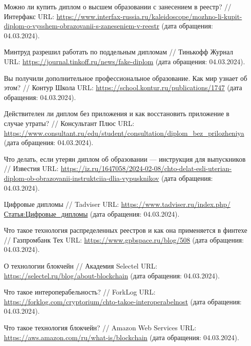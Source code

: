 \begin{thebibliography}{99\kern\bibindent}
    \setlength{\itemindent}{-0.35cm} %
	\setlength{\leftskip}{0.35cm}

	 Можно ли купить диплом о высшем образовании с занесением в реестр? // Интерфакс URL: \url{https://www.interfax-russia.ru/kaleidoscope/mozhno-li-kupit-diplom-o-vysshem-obrazovanii-s-zaneseniem-v-reestr} (дата обращения: 04.03.2024).

	 Минтруд разрешил работать по поддельным дипломам // Тинькофф Журнал URL: \url{https://journal.tinkoff.ru/news/fake-diplom} (дата обращения: 04.03.2024).

	 Вы получили дополнительное профессиональное образование. Как мир узнает об этом? // Контур Школа URL: \url{https://school.kontur.ru/publications/1747} (дата обращения: 04.03.2024).

	 Действителен ли диплом без приложения и как восстановить приложение в случае утраты? // Консультант Плюс URL: \url{https://www.consultant.ru/edu/student/consultation/diplom_bez_prilozheniya} (дата обращения: 04.03.2024).

	 Что делать, если утерян диплом об образовании — инструкция для выпускников // Известия URL: \url{https://iz.ru/1647058/2024-02-08/chto-delat-esli-uterian-diplom-ob-obrazovanii-instruktciia-dlia-vypusknikov} (дата обращения: 04.03.2024).

	 Цифровые дипломы // Tadviser URL: \url{https://www.tadviser.ru/index.php/Статья:Цифровые_дипломы} (дата обращения: 04.03.2024).

	 Что такое технология распределенных реестров и как она применяется в финтехе // Газпромбанк Тех URL: \url{https://www.gpbspace.ru/blog/508} (дата обращения: 04.03.2024).

	 О технологии блокчейн // Академия Selectel URL: \url{https://selectel.ru/blog/about-blockchain} (дата обращения: 04.03.2024).

	 Что такое интероперабельность? // ForkLog URL: \url{https://forklog.com/cryptorium/chto-takoe-interoperabelnost} (дата обращения: 04.03.2024).

	 Что такое технология блокчейн? // Amazon Web Services URL: \url{https://aws.amazon.com/ru/what-is/blockchain} (дата обращения: 04.03.2024).


\end{thebibliography}
